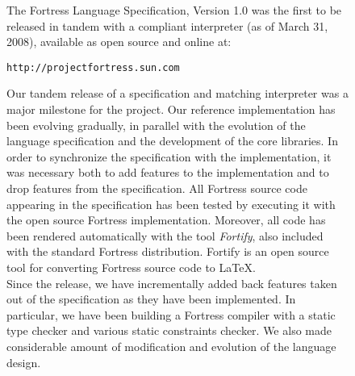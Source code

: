%
%
%
%

\begin{figure}[p]
The Fortress Language Specification, Version 1.0\cite{Fortress} was the first to be
released in tandem with a compliant interpreter (as of March 31, 2008),
available as open source and online at:\\

\begin{center}
{\tt http://projectfortress.sun.com}\\[1em]
\end{center}
Our tandem release of a specification and matching interpreter was a major
milestone for the project.
Our reference implementation has been evolving gradually,
in parallel with the evolution of the language specification and
the development of the core libraries.  In order to synchronize
the specification with the implementation, it was necessary both to add
features to the implementation and to drop features from the specification.
All Fortress source code appearing in the specification has been
tested by executing it with the open source Fortress implementation. Moreover,
all code has been rendered automatically with the tool \emph{Fortify}, also
included with the standard Fortress distribution. Fortify is an open source tool
for converting Fortress source code to \LaTeX.\\


Since the release, we have incrementally added back
features taken out of the specification as they have been implemented.
In particular, we have been building a Fortress compiler with a static
type checker and various static constraints checker.
We also made considerable amount of modification and evolution of the
language design.\\



\end{figure}

